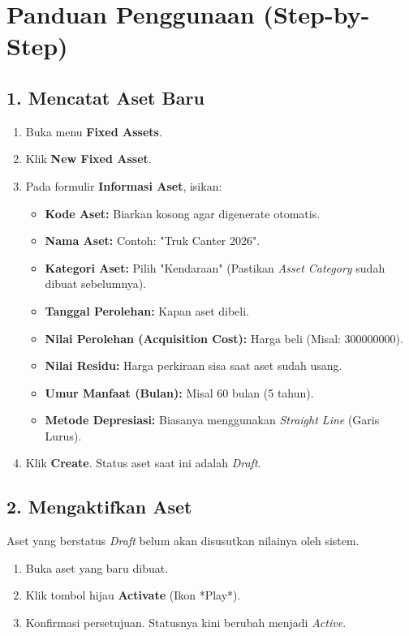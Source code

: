 \section{Panduan Penggunaan (Step-by-Step)}

\subsection{1. Mencatat Aset Baru}
\begin{enumerate}
    \item Buka menu \textbf{Fixed Assets}.
    \item Klik \textbf{New Fixed Asset}.
    \item Pada formulir \textbf{Informasi Aset}, isikan:
    \begin{itemize}
        \item \textbf{Kode Aset:} Biarkan kosong agar digenerate otomatis.
        \item \textbf{Nama Aset:} Contoh: "Truk Canter 2026".
        \item \textbf{Kategori Aset:} Pilih "Kendaraan" (Pastikan \textit{Asset Category} sudah dibuat sebelumnya).
        \item \textbf{Tanggal Perolehan:} Kapan aset dibeli.
        \item \textbf{Nilai Perolehan (Acquisition Cost):} Harga beli (Misal: 300000000).
        \item \textbf{Nilai Residu:} Harga perkiraan sisa saat aset sudah usang.
        \item \textbf{Umur Manfaat (Bulan):} Misal 60 bulan (5 tahun).
        \item \textbf{Metode Depresiasi:} Biasanya menggunakan \textit{Straight Line} (Garis Lurus).
    \end{itemize}
    \item Klik \textbf{Create}. Status aset saat ini adalah \textit{Draft}.
\end{enumerate}

\subsection{2. Mengaktifkan Aset}
Aset yang berstatus \textit{Draft} belum akan disusutkan nilainya oleh sistem.
\begin{enumerate}
    \item Buka aset yang baru dibuat.
    \item Klik tombol hijau \textbf{Activate} (Ikon *Play*).
    \item Konfirmasi persetujuan. Statusnya kini berubah menjadi \textit{Active}.
\end{enumerate}


